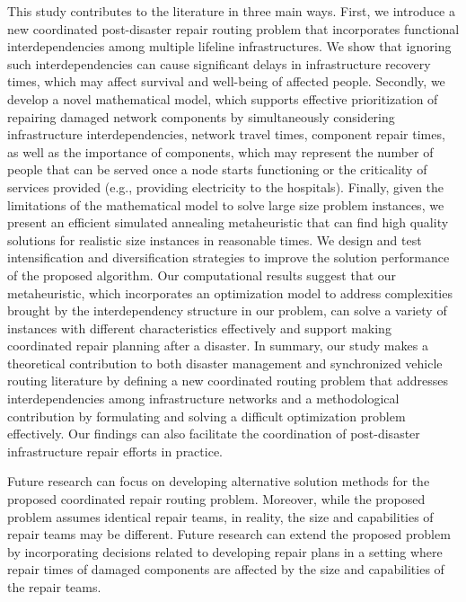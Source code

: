 \documentclass[11pt]{article}
\begin{document}
{\color{blue} This study contributes to the literature in three main ways. First, we introduce a new coordinated post-disaster repair routing problem that incorporates functional interdependencies among multiple lifeline infrastructures. We show that ignoring such interdependencies can cause significant delays in infrastructure recovery times, which may affect survival and well-being of affected people. Secondly, we develop a novel mathematical model, which supports effective prioritization of repairing damaged network components by simultaneously considering infrastructure interdependencies, network travel times, component repair times, as well as the importance of components, which may represent the number of people that can be served once a node starts functioning or the criticality of services provided (e.g., providing electricity to the hospitals). Finally, given the limitations of the mathematical model to solve large size problem instances, we present an efficient simulated annealing metaheuristic that can find high quality solutions for realistic size instances in reasonable times. We design and test intensification and diversification strategies to improve the solution performance of the proposed algorithm.  Our computational results suggest that our metaheuristic, which incorporates an optimization model to address complexities brought by the interdependency structure in our problem, can solve a variety of instances with different characteristics effectively and support making coordinated repair planning after a disaster. In summary, our study makes a theoretical contribution to both disaster management and synchronized vehicle routing literature by defining a new coordinated routing problem that addresses interdependencies among infrastructure networks and a methodological contribution by formulating and solving a difficult optimization problem effectively. Our findings can also facilitate the coordination of post-disaster infrastructure repair efforts in practice.}

Future research can focus on developing alternative solution methods for the proposed coordinated repair routing problem. Moreover, while the proposed problem assumes identical repair teams, in reality, the size and capabilities of repair teams may be different. Future research can extend the proposed problem by incorporating decisions related to developing repair plans in a setting where repair times of damaged components are affected by the size and capabilities of the repair teams.

\end{document}
